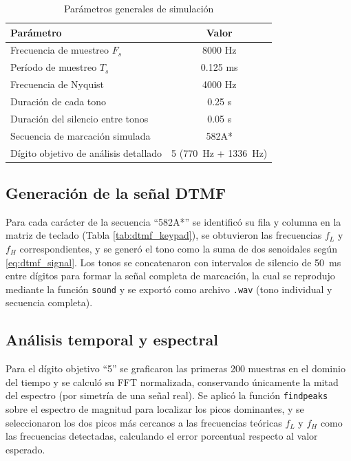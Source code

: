 \documentclass[conference]{IEEEtran}
\begin{document}
\begin{table}[!t]
\centering
\caption{Parámetros generales de simulación}
\label{tab:parametros}
\begin{tabular}{|l|c|}
\hline
\textbf{Parámetro} & \textbf{Valor} \\ \hline
Frecuencia de muestreo $F_s$ & 8000 Hz \\ \hline
Período de muestreo $T_s$ & 0.125 ms \\ \hline
Frecuencia de Nyquist & 4000 Hz \\ \hline
Duración de cada tono & 0.25 s \\ \hline
Duración del silencio entre tonos & 0.05 s \\ \hline
Secuencia de marcación simulada & 582A* \\ \hline
Dígito objetivo de análisis detallado & 5 (770~Hz + 1336~Hz) \\ \hline
\end{tabular}
\end{table}

\subsection{Generación de la señal DTMF}

Para cada carácter de la secuencia ``582A*'' se identificó su fila y columna en la matriz de teclado (Tabla \ref{tab:dtmf_keypad}), se obtuvieron las frecuencias $f_L$ y $f_H$ correspondientes, y se generó el tono como la suma de dos senoidales según \eqref{eq:dtmf_signal}. Los tonos se concatenaron con intervalos de silencio de 50~ms entre dígitos para formar la señal completa de marcación, la cual se reprodujo mediante la función \texttt{sound} y se exportó como archivo \texttt{.wav} (tono individual y secuencia completa).

\subsection{Análisis temporal y espectral}

Para el dígito objetivo ``5'' se graficaron las primeras 200 muestras en el dominio del tiempo y se calculó su FFT normalizada, conservando únicamente la mitad del espectro (por simetría de una señal real). Se aplicó la función \texttt{findpeaks} sobre el espectro de magnitud para localizar los picos dominantes, y se seleccionaron los dos picos más cercanos a las frecuencias teóricas $f_L$ y $f_H$ como las frecuencias detectadas, calculando el error porcentual respecto al valor esperado.
\end{document}
